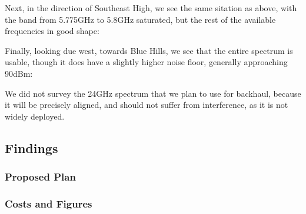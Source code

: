 Next, in the direction of Southeast High, we see the same sitation as above, with the band from 5.775GHz to 5.8GHz saturated, but the rest of the available frequencies in good shape:
\begin{center}
\end{center}
Finally, looking due west, towards Blue Hills, we see that the entire spectrum is usable, though it does have a slightly higher noise floor, generally approaching 90dBm:
\begin{center}
\end{center}
We did not survey the 24GHz spectrum that we plan to use for backhaul, because it will be precisely aligned, and should not suffer from interference, as it is not widely deployed.
\subsection{Findings}
\subsubsection{Proposed Plan}
\subsubsection{Costs and Figures}
